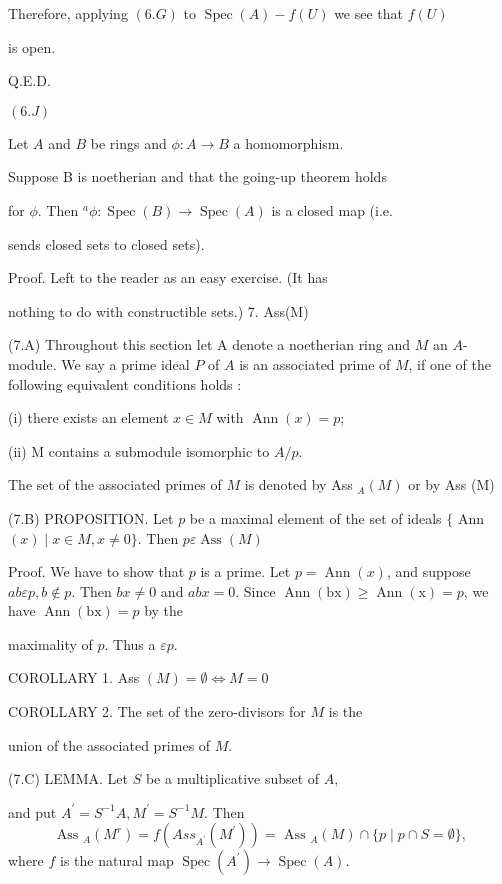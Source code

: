 Therefore, applying $(6 . G)$ to $\operatorname{Spec}(A)-f(U)$ we see that $f(U)$

is open.

Q.E.D.

$(6 . J)$

Let $A$ and $B$ be rings and $\phi: A \rightarrow B$ a homomorphism.

Suppose B is noetherian and that the going-up theorem holds

for $\phi .$ Then ${ }^{a} \phi: \operatorname{Spec}(B) \rightarrow \operatorname{Spec}(A)$ is a closed map (i.e.

sends closed sets to closed sets).

Proof. Left to the reader as an easy exercise. (It has

nothing to do with constructible sets.) 7. Ass(M)

(7.A) Throughout this section let A denote a noetherian ring and $M$ an $A$-module. We say a prime ideal $P$ of $A$ is an associated prime of $M$, if one of the following equivalent conditions holds :

(i) there exists an element $x \in M$ with $\operatorname{Ann}(x)=p$;

(ii) M contains a submodule isomorphic to $A / p$.

The set of the associated primes of $M$ is denoted by Ass ${ }_{A}(M)$ or by Ass (M)

(7.B) PROPOSITION. Let $p$ be a maximal element of the set of ideals $\{$ Ann $(x) \mid x \in M, x \neq 0\}$. Then $p \varepsilon \operatorname{Ass}(M)$

Proof. We have to show that $p$ is a prime. Let $p=\operatorname{Ann}(x)$, and suppose $a b \varepsilon p, b \notin p$. Then $b x \neq 0$ and $a b x=0$. Since $\operatorname{Ann}(\mathrm{bx}) \geq \operatorname{Ann}(\mathrm{x})=p$, we have $\operatorname{Ann}(\mathrm{bx})=p$ by the

maximality of $p$. Thus a $\varepsilon p$.

COROLLARY 1. Ass $(M)=\emptyset \Longleftrightarrow M=0$

COROLLARY 2. The set of the zero-divisors for $M$ is the

union of the associated primes of $M$.

(7.C) LEMMA. Let $S$ be a multiplicative subset of $A$,

and put $A^{\prime}=S^{-1} A, M^{\prime}=S^{-1} M$. Then
$$
\text { Ass }_{A}\left(M^{r}\right)=f\left(A s s_{A^{\prime}}\left(M^{\prime}\right)\right)=\text { Ass }_{A}(M) \cap\{p \mid p \cap S=\emptyset\},
$$
where $f$ is the natural map $\operatorname{Spec}\left(A^{\prime}\right) \rightarrow \operatorname{Spec}(A)$.

